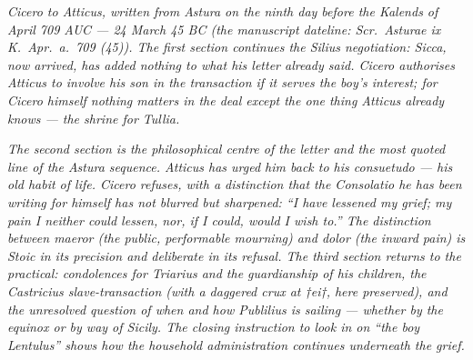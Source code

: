 
\textit{Cicero to Atticus, written from Astura on the
ninth day before the Kalends of April 709 AUC ---
24 March 45 BC (the manuscript dateline: \textit{Scr.\
Asturae ix K.\ Apr.\ a.\ 709 (45)}). The first section
continues the Silius negotiation: Sicca, now arrived,
has added nothing to what his letter already said.
Cicero authorises Atticus to involve his son in the
transaction if it serves the boy's interest; for
Cicero himself nothing matters in the deal except the
one thing Atticus already knows --- the shrine for
Tullia.}

\textit{The second section is the philosophical
centre of the letter and the most quoted line of the
Astura sequence. Atticus has urged him back to his
\textit{consuetudo} --- his old habit of life. Cicero
refuses, with a distinction that the \textit{Consolatio}
he has been writing for himself has not blurred but
sharpened: ``I have lessened my grief; my pain I
neither could lessen, nor, if I could, would I wish
to.'' The distinction between \textit{maeror} (the
public, performable mourning) and \textit{dolor}
(the inward pain) is Stoic in its precision and
deliberate in its refusal. The third section returns
to the practical: condolences for Triarius and the
guardianship of his children, the Castricius
slave-transaction (with a daggered crux at
\textit{†ei†}, here preserved), and the unresolved
question of when and how Publilius is sailing
--- whether by the equinox or by way of Sicily. The
closing instruction to look in on ``the boy Lentulus''
shows how the household administration continues
underneath the grief.}

